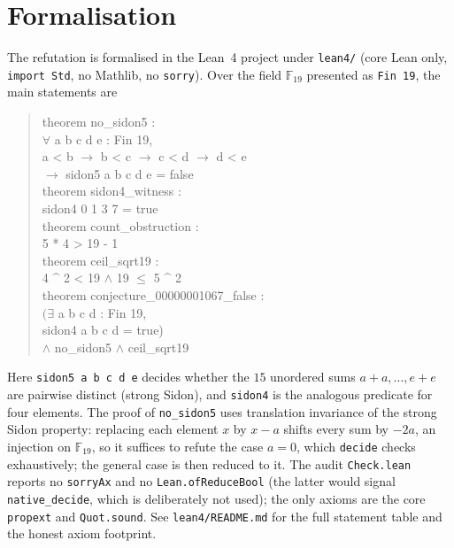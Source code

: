 \documentclass[11pt]{article}
\theoremstyle{definition}
\theoremstyle{remark}
\newcommand{\F}{\mathbb{F}}
\begin{document}
\section{Formalisation}

The refutation is formalised in the Lean~4 project under \texttt{lean4/}
(core Lean only, \texttt{import Std}, no Mathlib, no \texttt{sorry}). Over the
field $\F_{19}$ presented as \texttt{Fin 19}, the main statements are

\begin{quote}\small\ttfamily
theorem no\_sidon5 :\\
\hspace*{2em}\(\forall\) a b c d e : Fin 19,\\
\hspace*{2em}\phantom{\(\forall\) }a < b \(\to\) b < c \(\to\) c < d
   \(\to\) d < e\\
\hspace*{2em}\phantom{\(\forall\) }\(\to\) sidon5 a b c d e = false\\
theorem sidon4\_witness :\\
\hspace*{2em}sidon4 0 1 3 7 = true\\
theorem count\_obstruction :\\
\hspace*{2em}5 * 4 > 19 - 1\\
theorem ceil\_sqrt19 :\\
\hspace*{2em}4 \^{} 2 < 19 \(\wedge\) 19 \(\le\) 5 \^{} 2\\
theorem conjecture\_00000001067\_false :\\
\hspace*{2em}\((\exists\) a b c d : Fin 19,\\
\hspace*{2em}\phantom{(\(\exists\) }sidon4 a b c d = true)\\
\hspace*{2em}\(\wedge\) no\_sidon5 \(\wedge\) ceil\_sqrt19
\end{quote}

Here \texttt{sidon5 a b c d e} decides whether the $15$ unordered sums
$a+a,\dots,e+e$ are pairwise distinct (strong Sidon), and \texttt{sidon4} is
the analogous predicate for four elements. The proof of \texttt{no\_sidon5}
uses translation invariance of the strong Sidon property: replacing each
element $x$ by $x-a$ shifts every sum by $-2a$, an injection on $\F_{19}$,
so it suffices to refute the case $a=0$, which \texttt{decide} checks
exhaustively; the general case is then reduced to it. The audit
\texttt{Check.lean} reports no \texttt{sorryAx} and no \texttt{Lean.ofReduceBool}
(the latter would signal \texttt{native\_decide}, which is deliberately not
used); the only axioms are the core \texttt{propext} and \texttt{Quot.sound}.
See \texttt{lean4/README.md} for the full statement table and the honest axiom
footprint.
\end{document}
